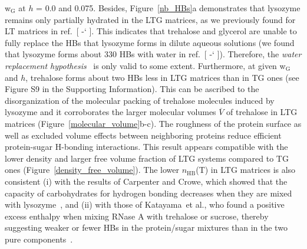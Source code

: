 \documentclass[journal=jpcbfk,manuscript=article]{achemso}
\newcommand*{\citen}[1]{%
\begingroup
\romannumeral-`\x %
\setcitestyle{numbers}%
\cite{#1}%
\endgroup   
}
\begin{document}
\begin{singlespacing}
w$_{\textrm{G}}$ at $h$ = 0.0 and 0.075. Besides, Figure~\ref{nb_HBs}a demonstrates that lysozyme 
remains only partially hydrated in the LTG matrices, as we previously found for LT matrices in ref.~[\citen{Lerbret2012}].
This indicates that trehalose and glycerol are unable to fully replace the HBs that lysozyme forms in dilute aqueous solutions 
(we found that lysozyme forms about 330 HBs with water in ref.~[\citen{Lerbret2007}]). Therefore, 
the \textit{water replacement hypothesis}~\cite{Crowe1984b} is only valid to some extent. Furthermore, at 
given w$_{\textrm{G}}$ and $h$, trehalose forms about two HBs less in LTG matrices than in TG ones (see Figure S9 in the Supporting Information). 
This can be ascribed to the disorganization of the molecular packing of trehalose molecules induced by
lysozyme and it corroborates the larger molecular volumes $\overline{V}$ of trehalose in LTG matrices (Figure~\ref{molecular_volume}b-c). 
The roughness of the protein surface as well as excluded volume effects between neighboring proteins reduce 
efficient protein-sugar H-bonding interactions. This result appears compatible with the lower density and larger free
volume fraction of LTG systems compared to TG ones (Figure~\ref{density_free_volume}). The lower $n_{\textrm{HB}}$(T) in LTG
matrices is also consistent (i) with the results of Carpenter and Crowe, which showed that the capacity of carbohydrates 
for hydrogen bonding decreases when they are mixed with lysozyme~\cite{Carpenter1989}, and (ii) with those of 
Katayama~et al., who found a positive excess enthalpy when mixing RNase A with trehalose or sucrose, 
thereby suggesting weaker or fewer HBs in the protein/sugar mixtures than in the two pure components~\cite{Katayama2009}.


\end{singlespacing}
\end{document}

